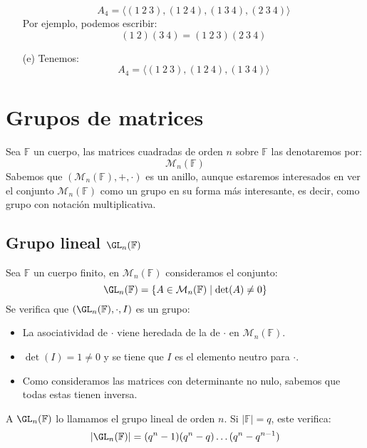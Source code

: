 \begin{ejemplo}
\begin{enumerate}[label=(\alph*)]
\begin{equation*}
                    A_4 = \langle (1\ 2\ 3), (1\ 2\ 4), (1\ 3\ 4), (2\ 3\ 4) \rangle 
                \end{equation*}
                Por ejemplo, podemos escribir:
                \begin{equation*}
                    (1\ 2)(3\ 4) = (1\ 2\ 3)(2\ 3\ 4)
                \end{equation*}
            \item[(e)] Tenemos:
                \begin{equation*}
                    A_4 = \langle (1\ 2\ 3), (1\ 2\ 4), (1\ 3\ 4) \rangle 
                \end{equation*}
    \end{enumerate}
\end{ejemplo}

\section{Grupos de matrices}
Sea $\mathbb{F}$ un cuerpo, las matrices cuadradas de orden $n$ sobre $\mathbb{F}$ las denotaremos por:
\begin{equation*}
    \mathcal{M}_n(\mathbb{F})
\end{equation*}
Sabemos que $(\mathcal{M}_n(\mathbb{F}), +, \cdot)$ es un anillo, aunque estaremos interesados en ver el conjunto $\mathcal{M}_n(\mathbb{F})$ como un grupo en su forma más interesante, es decir, como grupo con notación multiplicativa.

\subsection{Grupo lineal $\GL_n(\mathbb{F})$}
\begin{definicion} Sea $\mathbb{F}$ un cuerpo finito, en $\mathcal{M}_n(\mathbb{F})$ consideramos el conjunto:
    \begin{equation*}
        \GL_n(\mathbb{F}) = \{A\in \mathcal{M}_n(\mathbb{F}) \mid \det(A) \neq 0\}
    \end{equation*}
    Se verifica que $(\GL_n(\mathbb{F}),\cdot,I)$ es un grupo:
    \begin{itemize}
        \item La asociatividad de $\cdot $ viene heredada de la de $\cdot $ en $\mathcal{M}_n(\mathbb{F})$.
        \item $\det(I)=1\neq 0$ y se tiene que $I$ es el elemento neutro para $\cdot $.
        \item Como consideramos las matrices con determinante no nulo, sabemos que todas estas tienen inversa.
    \end{itemize}
    A $\GL_n(\mathbb{F})$ lo llamamos el grupo lineal de orden $n$. Si $|\mathbb{F}| =q$, este verifica:
    \begin{equation*}
        |\GL_n(\mathbb{F})| = (q^n-1)(q^n-q) \ldots (q^n-q^{n-1})
    \end{equation*}
\end{definicion}

